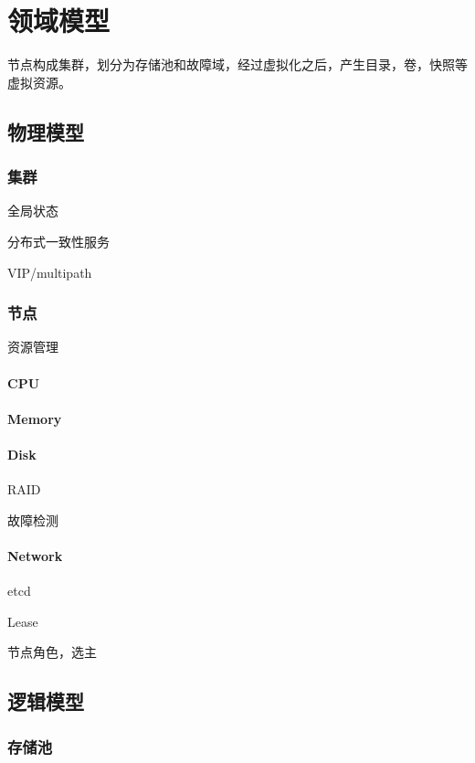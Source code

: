 \chapter{领域模型}

节点构成集群，划分为存储池和故障域，经过虚拟化之后，产生目录，卷，快照等虚拟资源。

\section{物理模型}

\subsection{集群}

全局状态

分布式一致性服务

VIP/multipath

\subsection{节点}

资源管理

\subsubsection{CPU}

\subsubsection{Memory}
\subsubsection{Disk}

RAID

故障检测

\subsubsection{Network}

etcd

Lease

节点角色，选主


\section{逻辑模型}

\subsection{存储池}

